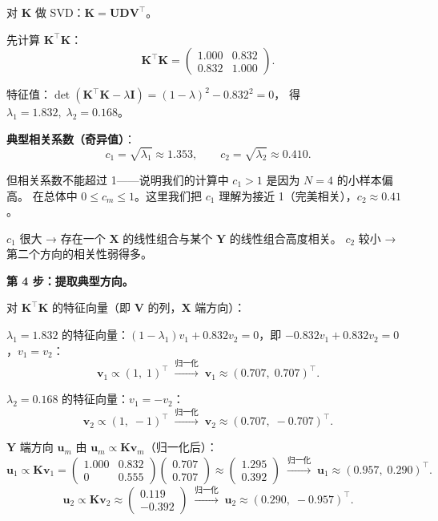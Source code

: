 对 $\mathbf{K}$ 做 SVD：$\mathbf{K} = \mathbf{U} \mathbf{D} \mathbf{V}^\top$。

先计算 $\mathbf{K}^\top \mathbf{K}$：
\[
    \mathbf{K}^\top \mathbf{K} = \begin{pmatrix}
        1.000 & 0.832 \\
        0.832 & 1.000
    \end{pmatrix}.
\]

特征值：$\det(\mathbf{K}^\top \mathbf{K} - \lambda \mathbf{I}) = (1-\lambda)^2 - 0.832^2 = 0$，
得 $\lambda_1 = 1.832,\; \lambda_2 = 0.168$。

\textbf{典型相关系数（奇异值）}：
\[
    c_1 = \sqrt{\lambda_1} \approx 1.353,\qquad
    c_2 = \sqrt{\lambda_2} \approx 0.410.
\]

但相关系数不能超过 1——说明我们的计算中 $c_1 > 1$ 是因为 $N=4$ 的小样本偏高。
在总体中 $0 \le c_m \le 1$。这里我们把 $c_1$ 理解为接近 1（完美相关），$c_2 \approx 0.41$。

$c_1$ 很大 → 存在一个 $\mathbf{X}$ 的线性组合与某个 $\mathbf{Y}$ 的线性组合高度相关。
$c_2$ 较小 → 第二个方向的相关性弱得多。

\medskip
\noindent
\textbf{第 4 步：提取典型方向。}

对 $\mathbf{K}^\top \mathbf{K}$ 的特征向量（即 $\mathbf{V}$ 的列，$\mathbf{X}$ 端方向）：

$\lambda_1 = 1.832$ 的特征向量：$(1-\lambda_1)v_1 + 0.832 v_2 = 0$，即 $-0.832 v_1 + 0.832 v_2 = 0$，$v_1 = v_2$：
\[
    \mathbf{v}_1 \propto (1,\; 1)^\top \;\xrightarrow{\text{归一化}}\; \mathbf{v}_1 \approx (0.707,\; 0.707)^\top.
\]

$\lambda_2 = 0.168$ 的特征向量：$v_1 = -v_2$：
\[
    \mathbf{v}_2 \propto (1,\; -1)^\top \;\xrightarrow{\text{归一化}}\; \mathbf{v}_2 \approx (0.707,\; -0.707)^\top.
\]

$\mathbf{Y}$ 端方向 $\mathbf{u}_m$ 由 $\mathbf{u}_m \propto \mathbf{K} \mathbf{v}_m$（归一化后）：
\[
    \mathbf{u}_1 \propto \mathbf{K}\mathbf{v}_1 = \begin{pmatrix} 1.000 & 0.832 \\ 0 & 0.555 \end{pmatrix}
    \begin{pmatrix} 0.707 \\ 0.707 \end{pmatrix}
    \approx \begin{pmatrix} 1.295 \\ 0.392 \end{pmatrix}
    \;\xrightarrow{\text{归一化}}\; \mathbf{u}_1 \approx (0.957,\; 0.290)^\top.
\]
\[
    \mathbf{u}_2 \propto \mathbf{K}\mathbf{v}_2 \approx \begin{pmatrix} 0.119 \\ -0.392 \end{pmatrix}
    \;\xrightarrow{\text{归一化}}\; \mathbf{u}_2 \approx (0.290,\; -0.957)^\top.
\]


